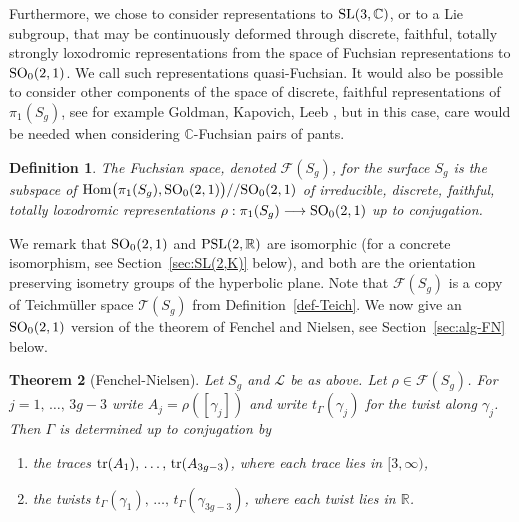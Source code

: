 \documentclass[11pt]{amsart}
\newtheorem{theorem}{Theorem}[section]
\newtheorem{definition}[theorem]{Definition}
\numberwithin{equation}{section}
\begin{document}
Furthermore, we chose to consider representations to ${\rm SL}(3,{\mathbb C})$, or to a Lie subgroup, 
that may be continuously deformed through discrete, faithful, totally strongly loxodromic representations from the space of
Fuchsian representations to ${\rm SO}_0(2,1)$. We call such representations quasi-Fuchsian. 
It would also be possible to consider other components
of the space of discrete, faithful representations of $\pi_1(S_g)$, see for example Goldman, Kapovich, Leeb \cite{G-K-L},
but in this case, care would be needed when considering ${\mathbb C}$-Fuchsian pairs of pants. 

\begin{definition}\label{def-Fuchs-space}
The Fuchsian space, denoted ${\mathcal F}(S_g)$, for the surface $S_g$
is the subspace of ${\rm Hom}\bigl(\pi_1(S_g),{\rm SO}_0(2,1)\bigr)//{\rm SO}_0(2,1)$ of irreducible, discrete, faithful, 
totally loxodromic representations $\rho:\pi_1(S_g)\longrightarrow {\rm SO}_0(2,1)$ up to conjugation. 
\end{definition}

We remark that ${\rm SO}_0(2,1)$ and 
${\rm PSL}(2,{\mathbb R})$ are isomorphic (for a concrete isomorphism, see Section~\ref{sec:SL(2,K)} below), 
and both are the orientation preserving isometry groups of the hyperbolic plane.
Note that ${\mathcal F}(S_g)$ is a copy of Teichm\"uller space ${\mathcal T}(S_g)$ from Definition~\ref{def-Teich}.
We now give an ${\rm SO}_0(2,1)$ version of the theorem of Fenchel and Nielsen, see Section~\ref{sec:alg-FN} below.

\begin{theorem}[Fenchel-Nielsen]\label{thm:main-SO(2,1)}
Let $S_g$ and ${\mathcal L}$ be as above. Let $\rho\in{\mathcal F}(S_g)$. 
For $j=1,\,\ldots,\,3g-3$ write $A_j=\rho([\gamma_j])$ and write $t_\Gamma(\gamma_j)$ for the twist along $\gamma_j$. 
Then $\Gamma$ is determined up to conjugation by
\begin{enumerate}
\item[(1)] the traces ${\rm tr}(A_1),\,\ldots,\,{\rm tr}(A_{3g-3})$, where each trace lies in $[3,\infty)$,
\item[(2)] the twists $t_\Gamma(\gamma_1),\,\ldots,\,t_\Gamma(\gamma_{3g-3})$, where each twist lies in ${\mathbb R}$. 
\end{enumerate}
\end{theorem}
\end{document}
